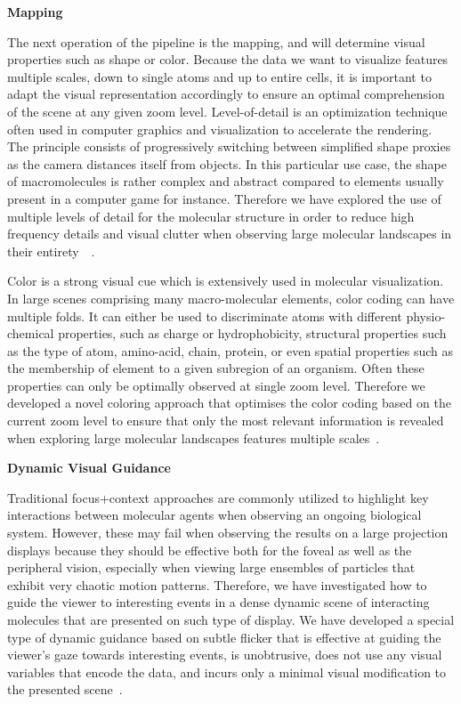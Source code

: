 \textbf{Mapping}

The next operation of the pipeline is the mapping, and will determine visual properties such as shape or color.
Because the data we want to visualize features multiple scales, down to single atoms and up to entire cells, it is important to adapt the visual representation accordingly to ensure an optimal comprehension of the scene at any given zoom level.
Level-of-detail is an optimization technique often used in computer graphics and visualization to accelerate the rendering.
The principle consists of progressively switching between simplified shape proxies as the camera distances itself from objects.
In this particular use case, the shape of macromolecules is rather complex and abstract compared to elements usually present in a computer game for instance.
Therefore we have explored the use of multiple levels of detail for the molecular structure in order to reduce high frequency details and visual clutter when observing large molecular landscapes in their entirety~\cite{le2015cellview}~\cite{le2014illustrative}. 

Color is a strong visual cue which is extensively used in molecular visualization.
In large scenes comprising many macro-molecular elements, color coding can have multiple folds.
It can either be used to discriminate atoms with different physio-chemical properties, such as charge or hydrophobicity, structural properties such as the type of atom, amino-acid, chain, protein, or even spatial properties such as the membership of element to a given subregion of an organism.
Often these properties can only be optimally observed at single zoom level.
Therefore we developed a novel coloring approach that optimises the color coding based on the current zoom level to ensure that only the most relevant information is revealed when exploring large molecular landscapes features multiple scales~\cite{waldin2016chameleon}.

\textbf{Dynamic Visual Guidance}

Traditional focus+context approaches are commonly utilized to highlight key interactions between molecular agents when observing an ongoing biological system.
However, these may fail when observing the results on a large projection displays because they should be effective both for the foveal as well as the peripheral vision, especially when viewing large ensembles of particles that exhibit very chaotic motion patterns.
Therefore, we have investigated how to guide the viewer to interesting events in a dense dynamic scene of interacting molecules that are presented on such type of display.
We have developed a special type of dynamic guidance based on subtle flicker that is effective at guiding the viewer's gaze towards interesting events, is unobtrusive, does not use any visual variables that encode the data, and incurs only a minimal visual modification to the presented scene~\cite{waldner2014attractive}.

